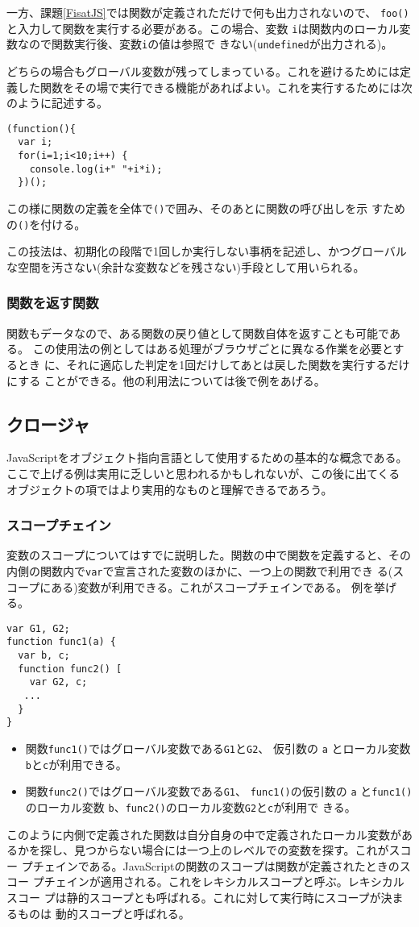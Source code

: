 \documentclass[a4j]{jarticle}
\begin{document}
一方、課題\ref{FisatJS}では関数が定義されただけで何も出力されないので、
\verb+foo()+と入力して関数を実行する必要がある。この場合、変数
\verb+i+は関数内のローカル変数なので関数実行後、変数\verb+i+の値は参照で
きない(\verb+undefined+が出力される)。

どちらの場合もグローバル変数が残ってしまっている。これを避けるためには定
義した関数をその場で実行できる機能があればよい。これを実行するためには次
のように記述する。
\begin{Verbatim}
(function(){
  var i;
  for(i=1;i<10;i++) {
    console.log(i+" "+i*i);
  })();
\end{Verbatim}
この様に関数の定義を全体で\verb+()+で囲み、そのあとに関数の呼び出しを示
すための\verb+()+を付ける。

この技法は、初期化の段階で1回しか実行しない事柄を記述し、かつグローバル
な空間を汚さない(余計な変数などを残さない)手段として用いられる。
\subsubsection{関数を返す関数}
関数もデータなので、ある関数の戻り値として関数自体を返すことも可能である。
この使用法の例としてはある処理がブラウザごとに異なる作業を必要とするとき
に、それに適応した判定を1回だけしてあとは戻した関数を実行するだけにする
ことができる。他の利用法については後で例をあげる。
\subsection{クロージャ}
JavaScriptをオブジェクト指向言語として使用するための基本的な概念である。
ここで上げる例は実用に乏しいと思われるかもしれないが、この後に出てくる
オブジェクトの項ではより実用的なものと理解できるであろう。
\subsubsection{スコープチェイン}
変数のスコープについてはすでに説明した。関数の中で関数を定義すると、その
内側の関数内で\verb+var+で宣言された変数のほかに、一つ上の関数で利用でき
る(スコープにある)変数が利用できる。これがスコープチェインである。
例を挙げる。
\begin{Verbatim}
var G1, G2;
function func1(a) {
  var b, c;
  function func2() [
    var G2, c;
   ...
  }
}
\end{Verbatim}
\begin{itemize}
 \item 関数\verb+func1()+ではグローバル変数である\verb+G1+と\verb+G2+、
       仮引数の \verb+a+ とローカル変数\verb+b+と\verb+c+が利用できる。
 \item 関数\verb+func2()+ではグローバル変数である\verb+G1+、
       \verb+func1()+の仮引数の \verb+a+ と\verb+func1()+のローカル変数
       \verb+b+、\verb+func2()+のローカル変数\verb+G2+と\verb+c+が利用で
       きる。
\end{itemize}
このように内側で定義された関数は自分自身の中で定義されたローカル変数があ
るかを探し、見つからない場合には一つ上のレベルでの変数を探す。これがスコー
プチェインである。JavaScriptの関数のスコープは関数が定義されたときのスコー
プチェインが適用される。これをレキシカルスコープと呼ぶ。レキシカルスコー
プは静的スコープとも呼ばれる。これに対して実行時にスコープが決まるものは
動的スコープと呼ばれる。
\end{document}
